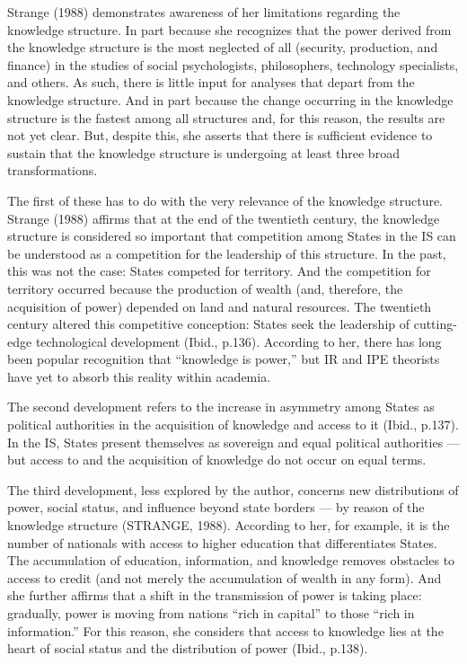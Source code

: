 Strange (1988) demonstrates awareness of her limitations regarding the knowledge structure. In part because she recognizes that the power derived from the knowledge structure is the most neglected of all (security, production, and finance) in the studies of social psychologists, philosophers, technology specialists, and others. As such, there is little input for analyses that depart from the knowledge structure. And in part because the change occurring in the knowledge structure is the fastest among all structures and, for this reason, the results are not yet clear. But, despite this, she asserts that there is sufficient evidence to sustain that the knowledge structure is undergoing at least three broad transformations.

The first of these has to do with the very relevance of the knowledge structure. Strange (1988) affirms that at the end of the twentieth century, the knowledge structure is considered so important that competition among States in the IS can be understood as a competition for the leadership of this structure. In the past, this was not the case: States competed for territory. And the competition for territory occurred because the production of wealth (and, therefore, the acquisition of power) depended on land and natural resources. The twentieth century altered this competitive conception: States seek the leadership of cutting-edge technological development (Ibid., p.136). According to her, there has long been popular recognition that ``knowledge is power,'' but IR and IPE theorists have yet to absorb this reality within academia.

The second development refers to the increase in asymmetry among States as political authorities in the acquisition of knowledge and access to it (Ibid., p.137). In the IS, States present themselves as sovereign and equal political authorities --- but access to and the acquisition of knowledge do not occur on equal terms.

The third development, less explored by the author, concerns new distributions of power, social status, and influence beyond state borders --- by reason of the knowledge structure (STRANGE, 1988). According to her, for example, it is the number of nationals with access to higher education that differentiates States. The accumulation of education, information, and knowledge removes obstacles to access to credit (and not merely the accumulation of wealth in any form). And she further affirms that a shift in the transmission of power is taking place: gradually, power is moving from nations ``rich in capital'' to those ``rich in information.'' For this reason, she considers that access to knowledge lies at the heart of social status and the distribution of power (Ibid., p.138).



